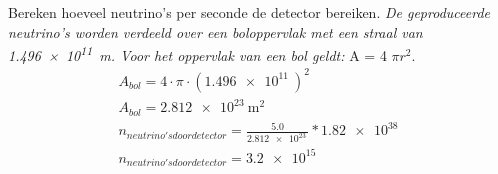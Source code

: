 \begin{opdrachten}
\begin{opdrachten}
    \item Bereken hoeveel neutrino's per seconde de detector bereiken.
    \textit{ De geproduceerde neutrino's worden verdeeld over een boloppervlak met een straal van \SI{1.496e11}{\meter}.
    Voor het oppervlak van een bol geldt:} A = 4 $\pi r^{2}$.
    \begin{eqnarray*}
    A_{bol} = 4 \cdot \pi \cdot (\SI{1.496e11}{}) ^2\\
    A_{bol} = \SI{2.812e23}{\meter\squared}\\
    n_{neutrino's door detector} = \frac{5.0}{\SI{2.812e23}{}} * \SI{1.82e38}{}\\
    n_{neutrino's door detector} = \SI{3.2e15}{}
    \end{eqnarray*}   
    \end{opdrachten}

\end{opdrachten}

